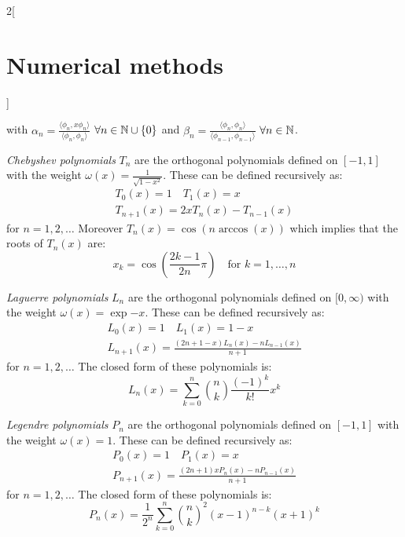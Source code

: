 \documentclass[../../../main.tex]{subfiles}
\begin{document}
\begin{multicols}{2}[\section{Numerical methods}]
\begin{theorem}
        with $\alpha_n=\frac{\langle\phi_n,x\phi_n\rangle}{\langle\phi_n,\phi_n\rangle}$ $\forall n\in\mathbb{N}\cup\{0\}$ and $\beta_n=\frac{\langle\phi_n,\phi_n\rangle}{\langle\phi_{n-1},\phi_{n-1}\rangle}$ $\forall n\in\mathbb{N}$.
    \end{theorem}
    \begin{definition}
        \textit{Chebyshev polynomials} $T_n$ are the orthogonal polynomials defined on $[-1,1]$ with the weight $\omega(x)=\frac{1}{\sqrt{1-x^2}}$. These can be defined recursively as:
        \begin{gather*}
            T_0(x)=1\quad T_1(x)=x\\T_{n+1}(x)=2xT_n(x)-T_{n-1}(x)
        \end{gather*}
        for $n=1,2,\ldots$ Moreover $T_n(x)=\cos(n\arccos(x))$ which implies that the roots of $T_n(x)$ are: $$x_k=\cos\left(\frac{2k-1}{2n}\pi\right)\quad\text{for }k=1,\ldots,n$$
    \end{definition}
    \begin{definition}
        \textit{Laguerre polynomials} $L_n$ are the orthogonal polynomials defined on $[0,\infty)$ with the weight $\omega(x)=\exp{-x}$. These can be defined recursively as:
        \begin{gather*}
            L_0(x)=1\quad L_1(x)=1-x\\ L_{n+1}(x)=\frac{(2n+1-x)L_n(x)-nL_{n-1}(x)}{n+1}
        \end{gather*}
        for $n=1,2,\ldots$ The closed form of these polynomials is: $$L_n(x)=\sum_{k=0}^n\binom{n}{k}\frac{(-1)^k}{k!}x^k$$
    \end{definition}
    \begin{definition}
        \textit{Legendre polynomials} $P_n$ are the orthogonal polynomials defined on $[-1,1]$ with the weight $\omega(x)=1$. These can be defined recursively as:
        \begin{gather*}
            P_0(x)=1\quad P_1(x)=x\\P_{n+1}(x)=\frac{(2n+1)xP_n(x)-nP_{n-1}(x)}{n+1}
        \end{gather*}
        for $n=1,2,\ldots$ The closed form of these polynomials is: $$P_n(x)=\frac{1}{2^n}\sum_{k=0}^n\binom{n}{k}^2(x-1)^{n-k}(x+1)^k$$
    \end{definition}

\end{multicols}
\end{document}
